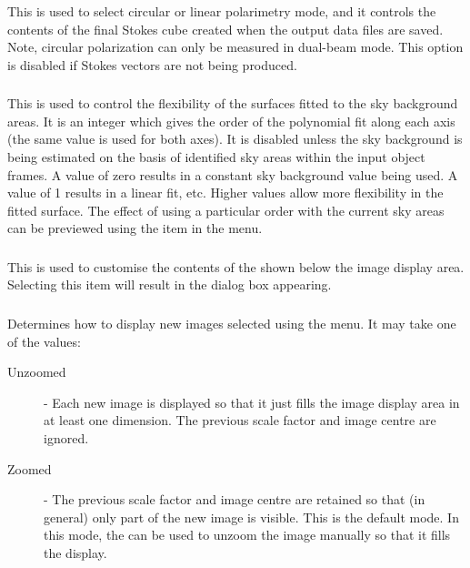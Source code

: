 \subsubsection {} This is used 
to select circular or linear polarimetry mode, and it controls the
contents of the final Stokes cube created when the output data files are
saved. Note, circular polarization can only be measured in dual-beam mode.
This option is disabled if Stokes vectors are not being produced. 

\subsubsection {} This is used to control
the flexibility of the surfaces fitted to the sky background areas. It is
an integer which gives the order of the polynomial fit along each axis
(the same value is used for both axes). It is disabled unless the sky
background is being estimated on the basis of identified sky areas within
the input object frames. A value of zero results in a constant sky
background value being used. A value of 1 results in a linear fit, etc.
Higher values allow more flexibility in the fitted surface. The effect of
using a particular order with the current sky areas can be previewed
using the 
 item in the 
 menu.

\subsubsection {} This is used to
customise the contents of the 
shown below the image display area. Selecting this item will result in the 
 dialog
box appearing.

\subsubsection {} Determines how to display new
images selected using the 
menu. It may take one of the values:

\begin{description}

\item [Unzoomed] - Each new image is displayed so that it just fills the 
image display area in at least one dimension. The previous scale factor
and image centre are ignored.

\item [Zoomed] - The previous scale factor and image centre are retained
so that (in general) only part of the new image is visible. This is the
default mode. In this mode, the  can
be used to unzoom the image manually so that it fills the display.

\end{description}

